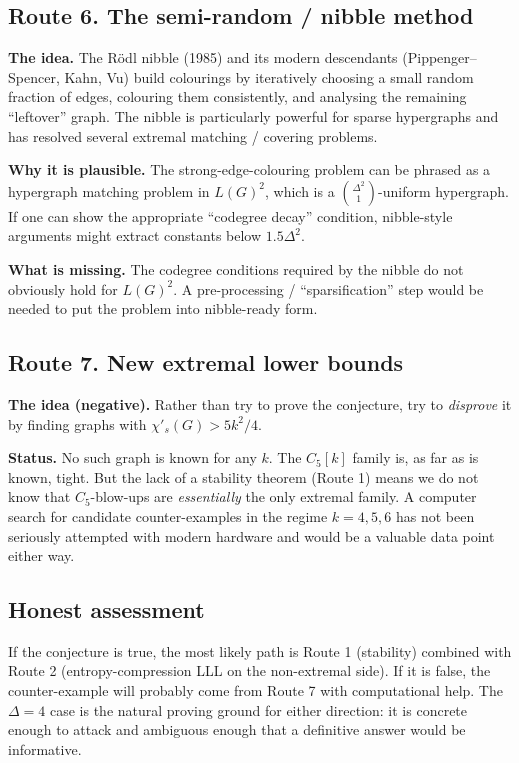 \documentclass[11pt]{article}
\newcommand{\sci}{\chi'_s}
\begin{document}
\subsection*{Route 6. The semi-random / nibble method}

\textbf{The idea.} The R\"odl nibble (1985) and its modern
descendants (Pippenger--Spencer, Kahn, Vu) build colourings by
iteratively choosing a small random fraction of edges, colouring them
consistently, and analysing the remaining ``leftover'' graph. The
nibble is particularly powerful for sparse hypergraphs and has
resolved several extremal matching / covering problems.

\textbf{Why it is plausible.} The strong-edge-colouring problem can
be phrased as a hypergraph matching problem in $L(G)^2$, which is a
$\binom{\Delta^2}{1}$-uniform hypergraph. If one can show the
appropriate ``codegree decay'' condition, nibble-style arguments
might extract constants below $1.5\Delta^2$.

\textbf{What is missing.} The codegree conditions required by the
nibble do not obviously hold for $L(G)^2$. A pre-processing /
``sparsification'' step would be needed to put the problem into
nibble-ready form.

\subsection*{Route 7. New extremal lower bounds}

\textbf{The idea (negative).} Rather than try to prove the
conjecture, try to \emph{disprove} it by finding graphs with
$\sci(G) > 5k^2/4$.

\textbf{Status.} No such graph is known for any $k$. The $C_5[k]$
family is, as far as is known, tight. But the lack of a stability
theorem (Route 1) means we do not know that $C_5$-blow-ups are
\emph{essentially} the only extremal family. A computer search for
candidate counter-examples in the regime $k = 4, 5, 6$ has not been
seriously attempted with modern hardware and would be a valuable
data point either way.

\subsection*{Honest assessment}

If the conjecture is true, the most likely path is Route 1
(stability) combined with Route 2 (entropy-compression LLL on the
non-extremal side). If it is false, the counter-example will
probably come from Route 7 with computational help. The
$\Delta = 4$ case is the natural proving ground for either
direction: it is concrete enough to attack and ambiguous enough
that a definitive answer would be informative.
\end{document}

